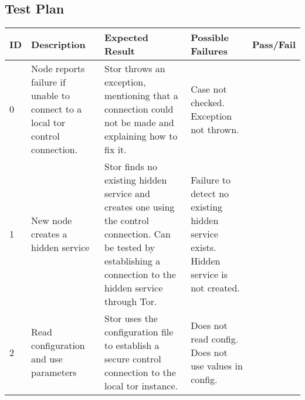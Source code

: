 \begin{landscape}
	\section{Test Plan}
	
	\begin{table}[h]
		\begin{tabular}{| l | p{7cm} | p{7cm} | p{4cm} | l |}
			\hline
			ID & Description & Expected Result & Possible Failures & Pass/Fail \\ \hline
			
			0 & Node reports failure if unable to connect to a local tor control connection. & Stor throws an exception, mentioning that a connection could not be made and explaining how to fix it. & Case not checked. \newline Exception not thrown. & \\ \hline
			
			1 & New node creates a hidden service & Stor finds no existing hidden service and creates one using the control connection. Can be tested by establishing a connection to the hidden service through Tor. & Failure to detect no existing hidden service exists. \newline Hidden service is not created. & \\ \hline
			
			2 & Read configuration and use parameters & Stor uses the configuration file to establish a secure control connection to the local tor instance. & Does not read config. \newline Does not use values in config. & \\ \hline
		\end{tabular}
	\end{table}
\end{landscape}